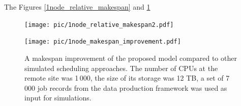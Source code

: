 \documentclass{svjour3}                     %
\begin{document}
The Figures \ref{1node_relative_makespan} and \ref{1node_makespan_improvement} 
%
\begin{figure}
\centering
\begin{minipage}{1\textwidth}
\centering
    \texttt{[image: pic/1node\_relative\_makespan2.pdf]}
    \caption{Dependence of the data production makespan on the network bandwidth using a single remote node. The number of CPUs at the remote site was 1\,000, the size of its storage was 12 TB, a set of 7\,000 job records from the data production framework was used as input for simulations. The makespan is given in units equal to 9 days, 15 hours, 39 minutes and 13 seconds which is the makespan of the no\_network approach.}
    \label{1node_relative_makespan}
\end{minipage}\hspace{3mm}%

\begin{minipage}{1\textwidth}
\centering
    \texttt{[image: pic/1node\_makespan\_improvement.pdf]}
    \caption{A makespan improvement of the proposed model compared to other simulated scheduling approaches. The number of CPUs at the remote site was 1\,000, the size of its storage was 12 TB, a set of 7\,000 job records from the data production framework was used as input for simulations.}
    \label{1node_makespan_improvement}
\end{minipage} 
\end{figure}
%
\end{document}
